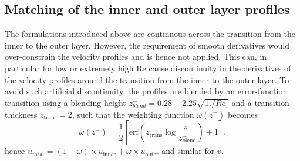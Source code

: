 \documentclass[smallcondensed,final]{svjour3}
\newcommand{\RE}{\mathrm{Re}}
\begin{document}
\subsection{Matching of the inner and outer layer profiles}
% 
The formulations introduced above are continuous across the transition from the inner to 
the outer layer. 
% 
However, the requirement of smooth derivatives would over-constrain the velocity profiles and is hence not applied. 
% 
This can, in particular for low or extremely high $\RE$ cause discontinuity in the derivatives of the velocity profiles around the transition from the inner to the outer layer. 
% 
To avoid such artificial discontinuity, the profiles are blended by an error-function transition using a blending 
height $z_{blend}^-=0.28-2.25\sqrt{1./Re_\tau}$ and a transition thickness 
$z_\text{trans}=2$, 
such that the weighting function $\omega(z^-)$ becomes 
\[
  \omega(z^-) = \frac12 \left[\text{erf}\left(z_\text{trans}\log\frac{z^-}{z_{\text{blend}}^{-}}\right) +1\right].
\]
hence 
 $u_\text{total} = (1-\omega) \times u_\text{inner} + \omega \times u_\text{outer}$ and similar for $v$. 
\end{document}
